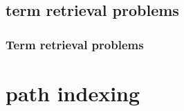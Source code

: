\documentclass[ 
xcolor={usenames,dvipsnames,svgnames,tablem} 
,handout
]{beamer}
\begin{document}
%

\begin{frame}

\end{frame}


\subsection{term retrieval problems}
\begin{frame}
\frametitle{Term retrieval problems}

\end{frame}


%
%


\begin{frame}
\begin{definition}

\end{definition}
\end{frame}

\section{path indexing}
\end{document}
